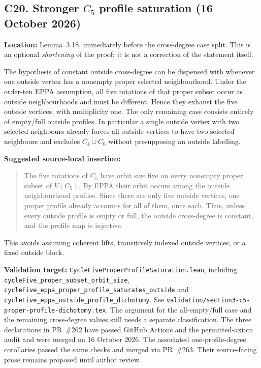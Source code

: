 \documentclass[11pt,a4paper]{article}
\begin{document}
\subsection*{C20. Stronger \(C_5\) profile saturation (16 October 2026)}
\textbf{Location:} Lemma~3.18, immediately before the
cross-degree case split. This is an optional \emph{shortening}
of the proof; it is not a correction of the statement itself.

The hypothesis of constant outside cross-degree can be dispensed
with whenever one outside vertex has a nonempty proper
selected neighbourhood. Under the order-ten EPPA assumption,
all five rotations of that proper subset occur as outside
neighbourhoods and must be different. Hence they exhaust the
five outside vertices, with multiplicity one. The only remaining
case consists entirely of empty/full outside profiles.
In particular a single outside vertex with two selected
neighbours already forces all outside vertices to have
two selected neighbours and excludes \(C_4\dot\cup C_6\)
without presupposing an outside labelling.

\textbf{Suggested source-local insertion:}
\begin{quote}
The five rotations of \(C_5\) have orbit size five
on every nonempty proper subset of \(V(C_5)\).
By EPPA their orbit occurs among the outside
neighbourhood profiles. Since there are only
five outside vertices, one proper profile
already accounts for all of them, once each.
Thus, unless every outside profile is empty
or full, the outside cross-degree is constant,
and the profile map is injective.
\end{quote}
This avoids assuming coherent lifts, transitively
indexed outside vertices, or a fixed outside block.

\textbf{Validation target:}
\texttt{CycleFiveProperProfileSaturation.lean},
including \texttt{cycleFive\_proper\_subset\_orbit\_size},
\texttt{cycleFive\_eppa\_proper\_profile\_saturates\_outside}
and \texttt{cycleFive\_eppa\_outside\_profile\_dichotomy}.
See \texttt{validation/section3-c5-proper-profile-dichotomy.tex}.
The argument for the all-empty/full case and the remaining
cross-degree values still needs a separate classification.
The three declarations in PR~\#262 have passed GitHub Actions
and the permitted-axiom audit and were merged on
16 October 2026. The associated one-profile-degree
corollaries passed the same checks and merged via PR~\#263.
Their source-facing prose remains proposed until author review.
\end{document}
